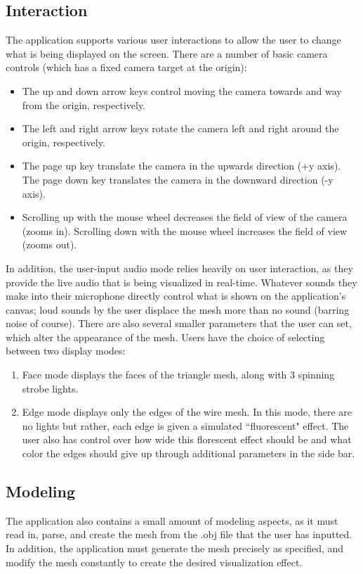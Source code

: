 \documentclass[12pt]{article}
\begin{document}
\subsection{Interaction}
The application supports various user interactions to allow the user to change what is being displayed on the screen. There are a number of basic camera controls (which has a fixed camera target at the origin):\\
\begin{itemize}
	\item The up and down arrow keys control moving the camera towards and way from the origin, respectively.
	\item The left and right arrow keys rotate the camera left and right around the origin, respectively.
	\item The page up key translate the camera in the upwards direction (+y axis). The page down key translates the camera in the downward direction (-y axis).
	\item Scrolling up with the mouse wheel decreases the field of view of the camera (zooms in). Scrolling down with the mouse wheel increases the field of view (zooms out).
\end{itemize}
In addition, the user-input audio mode relies heavily on user interaction, as they provide the live audio that is being visualized in real-time. Whatever sounds they make into their microphone directly control what is shown on the application's canvas; loud sounds by the user displace the mesh more than no sound (barring noise of course). There are also several smaller parameters that the user can set, which alter the appearance of the mesh. Users have the choice of selecting between two display modes:
\begin{enumerate}[1.)]
	\item Face mode displays the faces of the triangle mesh, along with 3 spinning strobe lights.
	\item Edge mode displays only the edges of the wire mesh. In this mode, there are no lights but rather, each edge is given a simulated ``fluorescent" effect. The user also has control over how wide this florescent effect should be and what color the edges should give up through additional parameters in the side bar.
\end{enumerate}
\subsection{Modeling}
The application also contains a small amount of modeling aspects, as it must read in, parse, and create the mesh from the .obj file that the user has inputted. In addition, the application must generate the mesh precisely as specified, and modify the mesh constantly to create the desired visualization effect. 
\end{document}
